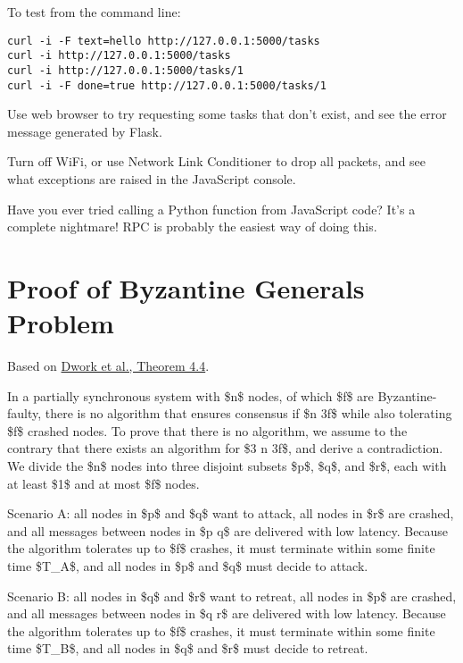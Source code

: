 \documentclass{article}
\begin{document}
To test from the command line:
\begin{verbatim}
curl -i -F text=hello http://127.0.0.1:5000/tasks
curl -i http://127.0.0.1:5000/tasks
curl -i http://127.0.0.1:5000/tasks/1
curl -i -F done=true http://127.0.0.1:5000/tasks/1
\end{verbatim}

Use web browser to try requesting some tasks that don't exist, and see the error message generated by Flask.

Turn off WiFi, or use Network Link Conditioner to drop all packets, and see what exceptions are raised in the JavaScript console.

Have you ever tried calling a Python function from JavaScript code? It's a complete nightmare! RPC is probably the easiest way of doing this.

\section{Proof of Byzantine Generals Problem}

Based on \href{https://groups.csail.mit.edu/tds/papers/Lynch/jacm88.pdf}{Dwork et al., Theorem 4.4}.

In a partially synchronous system with \$n\$ nodes, of which \$f\$ are Byzantine-faulty, there is no algorithm that ensures consensus if \$n \le 3f\$ while also tolerating \$f\$ crashed nodes.
To prove that there is no algorithm, we assume to the contrary that there exists an algorithm for \$3 \le n \le 3f\$, and derive a contradiction.
We divide the \$n\$ nodes into three disjoint subsets \$p\$, \$q\$, and \$r\$, each with at least \$1\$ and at most \$f\$ nodes.

Scenario A: all nodes in \$p\$ and \$q\$ want to attack, all nodes in \$r\$ are crashed, and all messages between nodes in \$p \cup q\$ are delivered with low latency.
Because the algorithm tolerates up to \$f\$ crashes, it must terminate within some finite time \$T_A\$, and all nodes in \$p\$ and \$q\$ must decide to attack.

Scenario B: all nodes in \$q\$ and \$r\$ want to retreat, all nodes in \$p\$ are crashed, and all messages between nodes in \$q \cup r\$ are delivered with low latency.
Because the algorithm tolerates up to \$f\$ crashes, it must terminate within some finite time \$T_B\$, and all nodes in \$q\$ and \$r\$ must decide to retreat.
\end{document}
